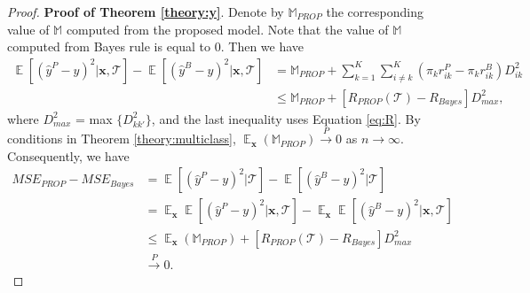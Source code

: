 \documentclass[12pt]{article}
\DeclareMathOperator{\E}{\mathbb{E}}
\begin{document}
\begin{proof}{\textbf{Proof of Theorem \ref{theory:y}}.}{}
Denote by $\mathbb{M}_{PROP}$ the corresponding value of $\mathbb{M}$ computed from the proposed model.
Note that the value of $\mathbb{M}$ computed from Bayes rule is equal to 0.
Then we have
\begin{align*}
\E[(\hat{y}^{P}-y)^2|\bm x, \mathcal{T}] - \E[(\hat{y}^{B}-y)^2|\bm x, \mathcal{T}]
&= \mathbb{M}_{PROP} + \sum_{k=1}^K \sum_{i \neq k}^K (\pi_k r_{ik}^{P} - \pi_k r_{ik}^{B}) D_{ik}^2    \\
&\leq  \mathbb{M}_{PROP} + [R_{PROP}(\mathcal{T}) - R_{Bayes}] D_{max}^2,
\end{align*}
where $D_{max}^2$ = max $\{ D_{kk'}^2 \}$, and the last inequality uses Equation \eqref{eq:R}.
By conditions in Theorem \ref{theory:multiclass}, $\E_{\bm x}(\mathbb{M}_{PROP}) \stackrel{P}{\rightarrow} 0$ as $n \rightarrow \infty$.
Consequently, we have
\begin{align*}
MSE_{PROP} - MSE_{Bayes} &= \E[(\hat{y}^{P}-y)^2|\mathcal{T}] - \E[(\hat{y}^{B}-y)^2|\mathcal{T}] \\
&= \E_{\bm x}\E[(\hat{y}^{P}-y)^2|\bm x, \mathcal{T}] - \E_{\bm x}\E[(\hat{y}^{B}-y)^2|\bm x, \mathcal{T}]  \\
& \leq \E_{\bm x}(\mathbb{M}_{PROP}) + [R_{PROP}(\mathcal{T}) - R_{Bayes}] D_{max}^2 \\
& \stackrel{P}{\rightarrow} 0.
\end{align*}



\end{proof}



\end{document}
